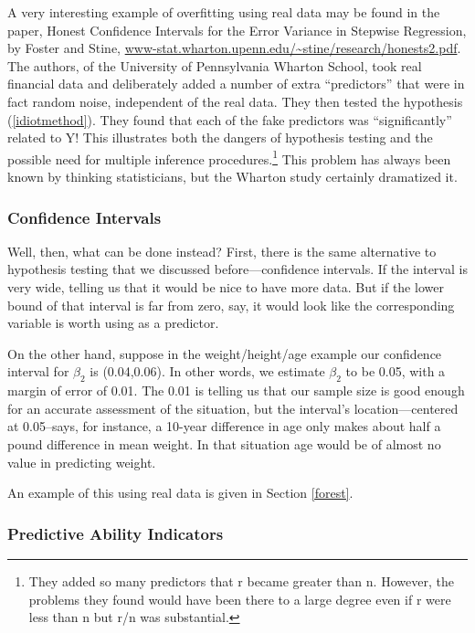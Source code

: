 A very interesting example of overfitting using real data may be found
in the paper, Honest Confidence Intervals for the Error Variance in
Stepwise Regression, by Foster and Stine,
\url{www-stat.wharton.upenn.edu/~stine/research/honests2.pdf}.  The
authors, of the University of Pennsylvania Wharton School, took real
financial data and deliberately added a number of extra ``predictors''
that were in fact random noise, independent of the real data.  They then
tested the hypothesis (\ref{idiotmethod}).  They found that each of the
fake predictors was ``significantly'' related to Y!  This illustrates
both the dangers of hypothesis testing and the possible need for
multiple inference procedures.\footnote{They added so many predictors
that r became greater than n.  However, the problems they found would
have been there to a large degree even if r were less than n but r/n was
substantial.} This problem has always been known by thinking
statisticians, but the Wharton study certainly dramatized it.

\subsubsection{Confidence Intervals}

Well, then, what can be done instead?  First, there is the same
alternative to hypothesis testing that we discussed before---confidence
intervals.  If the interval is very wide, telling us that it would be
nice to have more data.  But if the lower bound of that interval is far
from zero, say, it would look like the corresponding variable is worth
using as a predictor.

On the other hand, suppose in the weight/height/age example our
confidence interval for $\beta_2$ is (0.04,0.06).  In other words, we
estimate $\beta_2$ to be 0.05, with a margin of error of 0.01.  The 0.01
is telling us that our sample size is good enough for an accurate
assessment of the situation, but the interval's location---centered at
0.05--says, for instance, a 10-year difference in age only makes about
half a pound difference in mean weight.  In that situation age would be
of almost no value in predicting weight. 

An example of this using real data is given in Section \ref{forest}.

\subsubsection{Predictive Ability Indicators}
\label{predabil}

